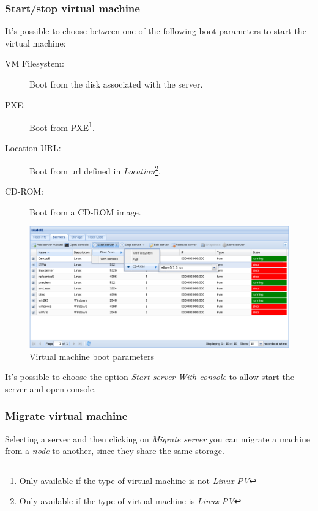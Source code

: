 \subsubsection{Start/stop virtual machine}
\label{sec:start_server}

It's possible to choose between one of the following boot parameters to start the virtual machine:
\begin{description}
    \item[VM Filesystem:] Boot from the disk associated with the server.
    \item[PXE:] Boot from PXE\footnote{Only available if the type of virtual machine is not \emph{Linux PV}\label{foot:notpv}}.
    \item[Location URL:] Boot from url defined in \emph{Location}\footnote{Only available if the type of virtual machine is \emph{Linux PV}}.
	\item[CD-ROM:] Boot from a CD-ROM image.
    	 
\end{description}

\begin{figure}[H]
	\begin{center}
	\includegraphics[scale=0.45]{screenshots/server_start.png}
	\caption{Virtual machine boot parameters}
	\label{fig:server_start}
	\end{center}
\end{figure}

It's possible to choose the option \emph{Start server} \emph{With console} to allow start the server and open console.

\subsubsection{Migrate virtual machine}
\label{sec:migrate_server}

Selecting a server and then clicking on \emph{Migrate server} you can migrate a machine from a \emph{node} to another, since they share the same storage.


